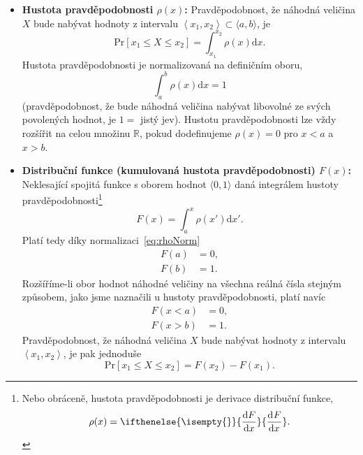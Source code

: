 \documentclass[a4paper,11pt,twoside]{article}
\renewcommand{\d}{\mathrm{d}}           %
\newcommand{\derivative}[3][]{\ifthenelse{\isempty{#1}}	    %
	{\frac{\d{#2}}{\d{#3}}}
	{\frac{\d^{#1}{#2}}{\d{#3}^{#1}}}
}
\def\probability#1{\mathrm{Pr}\left[#1\right]}
\theoremstyle{red}
\theoremstyle{green}
\begin{document}
        \begin{itemize}
            \item {\bf Hustota pravděpodobnosti  $\rho(x)$:}
                Pravděpodobnost, že náhodná veličina $X$ bude nabývat hodnoty z intervalu $\left\langle x_{1},x_{2}\right\rangle\subset\langle a,b\rangle$, je
                \begin{equation}
                    \probability{x_{1}\le X\le x_{2}}=\int_{x_{1}}^{x_{2}}\rho(x)\d x.
                \end{equation}
                Hustota pravděpodobnosti je normalizovaná na definičním oboru,
                \begin{equation}\label{eq:rhoNorm}
                    \int_{a}^{b}\rho(x)\d x=1
                \end{equation}
                (pravděpodobnost, že bude náhodná veličina nabývat libovolné ze svých povolených hodnot, je $1=$ jistý jev).
                Hustotu pravděpodobnosti lze vždy rozšířit na celou množinu $\mathbb{R}$, pokud dodefinujeme $\rho(x)=0$ pro $x<a$ a $x>b$.

            \item {\bf Distribuční funkce (kumulovaná hustota pravděpodobnosti) $F(x)$:} 
                Neklesající spojitá funkce s oborem hodnot $\langle 0,1\rangle$ daná integrálem hustoty pravděpodobnosti\footnote{
                    Nebo obráceně, hustota pravděpodobnosti je derivace distribuční funkce,
                    \begin{equation}
                        \label{eq:rhoF}
                        \rho(x)=\derivative{F}{x}.
                    \end{equation}
                }
                \begin{equation}
                    F(x)=\int_{a}^{x}\rho(x')\d x'.
                \end{equation}
                Platí tedy díky normalizaci~\eqref{eq:rhoNorm}
                \begin{align*}
                    F(a)&=0,\\
                    F(b)&=1.
                \end{align*}
                Rozšíříme-li obor hodnot náhodné veličiny na všechna reálná čísla stejným způsobem, jako jsme naznačili u hustoty pravděpodobnosti, platí navíc
                \begin{align*}
                    F(x<a)&=0,\\
                    F(x>b)&=1.
                \end{align*}
                Pravděpodobnost, že náhodná veličina $X$ bude nabývat hodnoty z intervalu $\left\langle x_{1},x_{2}\right\rangle$, je pak jednoduše
                \begin{equation}
                    \probability{x_{1}\le X\le x_{2}}=F(x_{2})-F(x_{1}).
                \end{equation}


\end{itemize}
\end{document}
